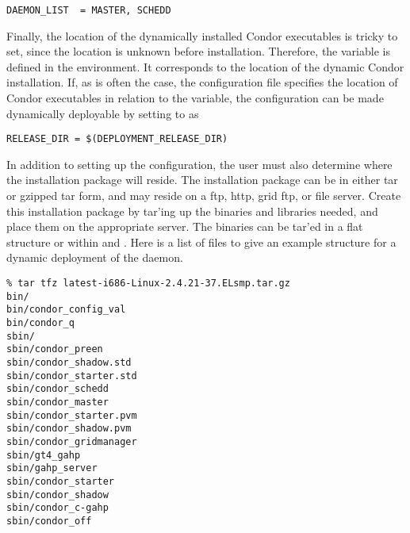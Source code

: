 \footnotesize
\begin{verbatim}
DAEMON_LIST  = MASTER, SCHEDD
\end{verbatim}
\normalsize

Finally, the location
of the dynamically installed Condor executables is tricky to set,
since the location is unknown before installation.
Therefore,
the variable  is defined in the environment.
It corresponds to the location of the dynamic Condor installation.
If, as is often the case, 
the configuration file specifies the location of Condor executables in
relation to the  variable, the configuration can
be made dynamically deployable by setting  to
 as 

\footnotesize
\begin{verbatim}
RELEASE_DIR = $(DEPLOYMENT_RELEASE_DIR)
\end{verbatim}
\normalsize

In addition to setting up the configuration, the user must also
determine where the installation package will reside.
The installation package can be in either tar or 
gzipped tar form, and may
reside on a ftp, http, grid ftp, or file server.  
Create this installation package by tar'ing up the binaries and libraries
needed, and place them on the appropriate server.
The binaries can be tar'ed in a flat structure or within  and
.  Here is a list of files to give an example
structure for a dynamic deployment of the  daemon.

\footnotesize
\begin{verbatim}
% tar tfz latest-i686-Linux-2.4.21-37.ELsmp.tar.gz
bin/
bin/condor_config_val
bin/condor_q
sbin/
sbin/condor_preen
sbin/condor_shadow.std
sbin/condor_starter.std
sbin/condor_schedd
sbin/condor_master
sbin/condor_starter.pvm
sbin/condor_shadow.pvm
sbin/condor_gridmanager
sbin/gt4_gahp
sbin/gahp_server
sbin/condor_starter
sbin/condor_shadow
sbin/condor_c-gahp
sbin/condor_off 
\end{verbatim}
\normalsize
